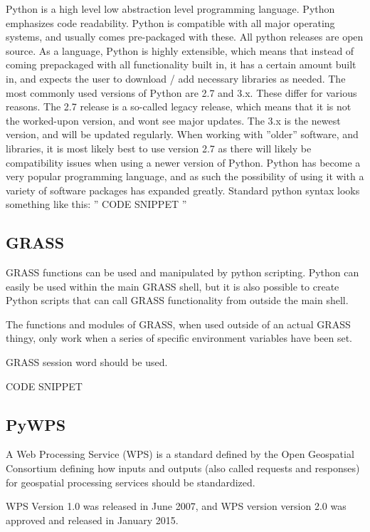 Python is a high level low abstraction level programming language. Python emphasizes code readability. Python is compatible with all major operating systems, and usually comes pre-packaged with these. 
All python releases are open source. 
As a language, Python is highly extensible, which means that instead of coming prepackaged with all functionality built in, it has a certain amount built in, and expects the user to download / add necessary libraries as needed. 
The most commonly used versions of Python are 2.7 and 3.x. These differ for various
reasons. The 2.7 release is a so-called legacy release, which means that it is not the worked-upon version, and wont see major updates. The 3.x is the newest version, and will be updated regularly. When working with ''older'' software, and libraries, it is most likely best to use version 2.7 as there will likely be compatibility issues when using a newer version of Python.
Python has become a very popular programming language, and as such the possibility of using it with a variety of software packages has expanded greatly. 
Standard python syntax looks something like this:
'' CODE SNIPPET ''

\subsection*{GRASS}

GRASS functions can be used and manipulated by python scripting. Python can easily be used within the main GRASS shell, but it is also possible to create Python scripts that can call GRASS functionality from outside the main shell.

The functions and modules of GRASS, when used outside of an actual GRASS thingy, only work when a series of specific environment variables have been set. 

GRASS session word should be used.

\“ CODE SNIPPET \”

\subsection*{PyWPS}

A Web Processing Service (WPS) is a standard defined by the Open Geospatial Consortium defining how inputs and outputs (also called requests and responses) for geospatial processing services should be standardized. 

WPS Version 1.0 was released in June 2007, and WPS version version 2.0 was approved and released in January 2015.


